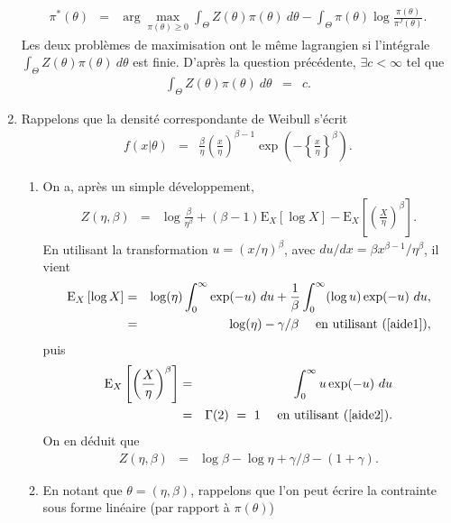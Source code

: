 \documentclass[10pt]{article}
\newcommand{\E}{\mbox{E}}
\newcommand{\1}{\mathbbm{1}}
\begin{document}
\begin{enumerate}
 \begin{eqnarray*}
\pi^*(\theta) & = & \arg\max\limits_{\pi(\theta)\geq 0}  \int_{\Theta} Z(\theta) \pi(\theta) \ d\theta - \int_{\Theta}
\pi(\theta) \log \frac{\pi(\theta)}{\pi^J(\theta)}. 
\end{eqnarray*}
Les deux probl\`emes de maximisation ont le m\^eme lagrangien si l'int\'egrale $\int_{\Theta} Z(\theta) \pi(\theta) \ d\theta $ est finie. D'apr\`es la question pr\'ec\'edente, $\exists c<\infty$ tel que 
\begin{eqnarray*}
\int_{\Theta} Z(\theta) \pi(\theta) \ d\theta & = & c.
\end{eqnarray*}
\item Rappelons que la densit\'e correspondante de Weibull s'\'ecrit
\begin{eqnarray*}
f(x|\theta) & = & \frac{\beta}{\eta} \left(\frac{x}{\eta}\right)^{\beta-1} \exp\left(-\left\{\frac{x}{\eta}\right\}^{\beta}\right).
\end{eqnarray*}
\begin{enumerate}
\item On a, apr\`es un simple d\'eveloppement,
\begin{eqnarray*}
Z(\eta,\beta) & = & \log \frac{\beta}{\eta^{\beta}} + (\beta-1) \E_X\left[\log X\right] -  \E_X\left[\left(\frac{X}{\eta}\right)^{\beta}\right]. 
\end{eqnarray*}
En utilisant la transformation $u=(x/\eta)^{\beta}$, avec $du/dx = \beta x^{\beta-1}/\eta^{\beta}$, il vient
\begin{eqnarray*}
\E_X\left[\log X\right] & = & \log(\eta) \int_{0}^{\infty} \exp(-u) \ du + \frac{1}{\beta} \int_{0}^{\infty} (\log u)  \exp(-u) \ du, \\
& = &  \log(\eta) - \gamma/\beta \ \ \ \ \text{en utilisant (\ref{aide1})},
\end{eqnarray*}
puis
\begin{eqnarray*}
\E_X\left[\left(\frac{X}{\eta}\right)^{\beta}\right] & = &  \int_{0}^{\infty} u \exp(-u) \ du  \\
& = &  \Gamma(2) \ = \ 1 \ \ \ \ \text{en utilisant (\ref{aide2})}.
\end{eqnarray*}
On en d\'eduit que
\begin{eqnarray*}
Z(\eta,\beta) & = & \log \beta - \log \eta + \gamma/\beta - (1+\gamma). 
\end{eqnarray*}
\item En notant que $\theta=(\eta,\beta)$, rappelons que l'on peut \'ecrire la contrainte sous forme lin\'eaire (par rapport \`a $\pi(\theta)$)

\end{enumerate}
\end{enumerate}
\end{document}
